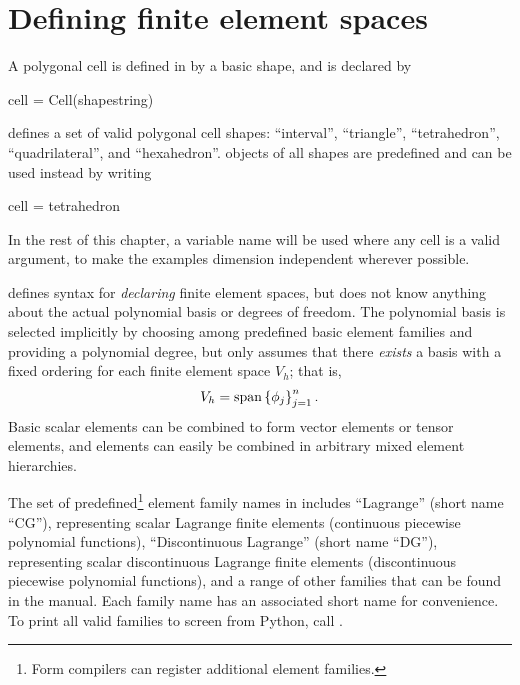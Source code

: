 \section{Defining finite element spaces} \label{ufl:sec:elements}
A polygonal cell is defined in \ufl{} by a basic shape, and is declared by
\begin{python}
cell = Cell(shapestring)
\end{python}
\ufl{} defines a set of valid polygonal cell shapes: ``interval'',
``triangle'', ``tetrahedron'', ``quadrilateral'', and ``hexahedron''.
 objects of all shapes are predefined and can be used
instead by writing
\begin{python}
cell = tetrahedron
\end{python}
In the rest of this chapter, a variable name  will be used
where any cell is a valid argument, to make the examples dimension
independent wherever possible.

\ufl{} defines syntax for \emph{declaring} finite element spaces, but
does not know anything about the actual polynomial basis or degrees of
freedom. The polynomial basis is selected implicitly by choosing among
predefined basic element families and providing a polynomial degree,
but \ufl{} only assumes that there \emph{exists} a basis with a fixed
ordering for each finite element space $V_h$; that is,
\begin{align}
V_h = \operatorname{span}\left\{ \phi_j \right\}_{j=1}^{n}.
\end{align}
Basic scalar elements can be combined to form vector elements or
tensor elements, and elements can easily be combined in arbitrary
mixed element hierarchies.

The set of predefined\footnote{Form compilers can register additional
  element families.}  element family names in \ufl{} includes
``Lagrange'' (short name ``CG''), representing scalar Lagrange finite
elements (continuous piecewise polynomial functions), ``Discontinuous
Lagrange'' (short name ``DG''), representing scalar discontinuous
Lagrange finite elements (discontinuous piecewise polynomial
functions), and a range of other families that can be found in the
manual.  Each family name has an associated short name for
convenience.  To print all valid families to screen from Python, call
.

